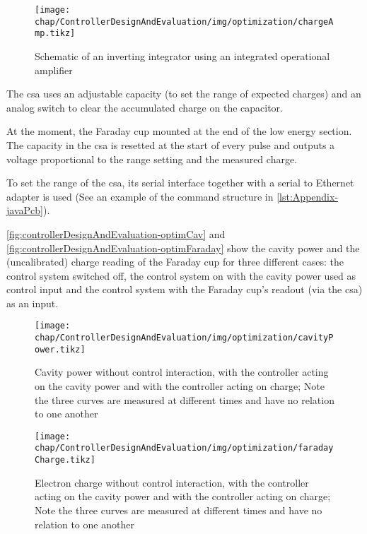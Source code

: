 \begin{figure}[tb]
	\centering
	\texttt{[image: chap/ControllerDesignAndEvaluation/img/optimization/chargeAmp.tikz]}
	\caption{Schematic of an inverting integrator using an integrated operational amplifier}
	\label{fig:controllerDesignAndEvaluation-integrator}
\end{figure}

The \gls{csa} uses an adjustable capacity (to set the range of expected charges) and an analog switch to clear the accumulated charge on the capacitor.

At the moment, the Faraday cup mounted at the end of the low energy section. The capacity in the \gls{csa} is resetted at the start of every pulse and outputs a voltage proportional to the range setting and the measured charge.

To set the range of the \gls{csa}, its serial interface together with a serial to Ethernet adapter is used (See an example of the command structure in \autoref{lst:Appendix-javaPcb}).

\autoref{fig:controllerDesignAndEvaluation-optimCav} and \autoref{fig:controllerDesignAndEvaluation-optimFaraday} show the cavity power and the (uncalibrated) charge reading of the Faraday cup for three different cases: the control system switched off, the control system on with the cavity power used as control input and the control system with the Faraday cup's readout (via the \gls{csa}) as an input.

\begin{figure}[tb]
	\centering
	\texttt{[image: chap/ControllerDesignAndEvaluation/img/optimization/cavityPower.tikz]}
	\caption{Cavity power without control interaction, with the controller acting on the cavity power and with the controller acting on charge; Note the three curves are measured at different times and have no relation to one another}
	\label{fig:controllerDesignAndEvaluation-optimCav}
\end{figure}

\begin{figure}[tb]
	\centering
	\texttt{[image: chap/ControllerDesignAndEvaluation/img/optimization/faradayCharge.tikz]}
	\caption{Electron charge without control interaction, with the controller acting on the cavity power and with the controller acting on charge; Note the three curves are measured at different times and have no relation to one another}
	\label{fig:controllerDesignAndEvaluation-optimFaraday}
\end{figure}









